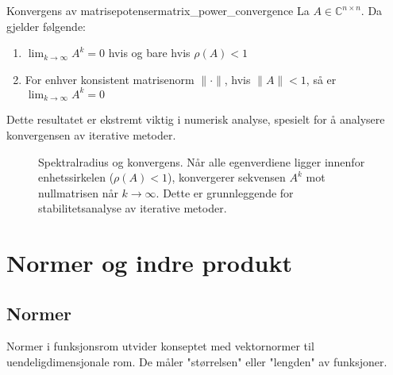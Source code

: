 \begin{theorem}{Konvergens av matrisepotenser}{matrix_power_convergence}
	La $A \in \mathbb{C}^{n \times n}$. Da gjelder følgende:
	\begin{enumerate}
		\item $\lim_{k \to \infty} A^k = 0$ hvis og bare hvis $\rho(A) < 1$
		\item For enhver konsistent matrisenorm $\|\cdot\|$, hvis $\|A\| < 1$, så er $\lim_{k \to \infty} A^k = 0$
	\end{enumerate}
\end{theorem}

Dette resultatet er ekstremt viktig i numerisk analyse, spesielt for å analysere konvergensen av iterative metoder.

\begin{figure}
	\centering
	\caption{Spektralradius og konvergens. Når alle egenverdiene ligger innenfor enhetssirkelen ($\rho(A) < 1$), konvergerer sekvensen $A^k$ mot nullmatrisen når $k \to \infty$. Dette er grunnleggende for stabilitetsanalyse av iterative metoder.}
	\label{fig:spectral_radius}
\end{figure}

\section{Normer og indre produkt}
\subsection{Normer}
Normer i funksjonsrom utvider konseptet med vektornormer til uendeligdimensjonale rom. De måler "størrelsen" eller "lengden" av funksjoner.

